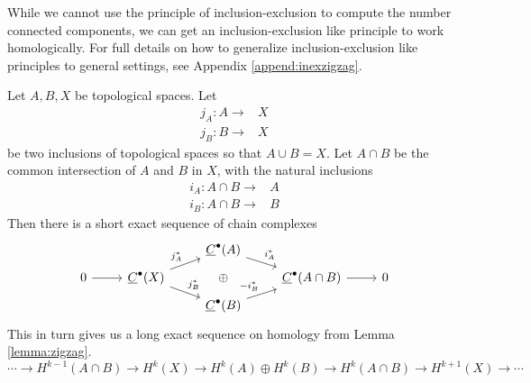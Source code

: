 While we cannot use the principle of inclusion-exclusion to compute the number connected components, we can get an inclusion-exclusion like principle to work homologically. For full details on how to generalize inclusion-exclusion like principles to general settings, see Appendix \ref{append:inexzigzag}.
\begin{theorem}
Let $A, B, X$ be topological spaces. Let 
\begin{align*} j_A:A\to& X\\
j_B: B\to& X
\end{align*}
 be two inclusions of topological spaces so that $A\cup B=X$. Let $A\cap B$ be the common intersection of $A$ and $B$ in $X$, with the natural inclusions 
 \begin{align*}
 i_A:A\cap B\to& A \\
  i_B: A \cap B\to & B
 \end{align*}
 Then there is a short exact sequence of chain complexes
 \[\begin{tikzcd}[row sep=tiny]
  \;& &  \underline C^\bullet(A) \arrow{dr}{i^*_A}\\
 0 \arrow{r}& \underline C^\bullet(X)\arrow{ru}{j^*_A} \arrow{rd}{j^*_B} & \oplus & \underline C^\bullet(A\cap B)\arrow{r} & 0\\
 & & \underline C^\bullet(B) \arrow{ur}{-i^*_B}
 \end{tikzcd}\]
 This in turn gives us a long exact sequence on homology from Lemma \ref{lemma:zigzag}.
 \[\cdots\to  H^{k-1}(A\cap B)\to H^k(X)\to H^k(A)\oplus H^k(B)\to H^k(A\cap B)\to H^{k+1} (X)\to \cdots \]
\end{theorem}
